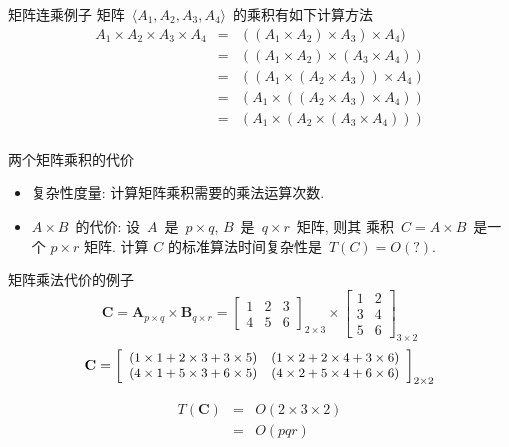 \documentclass[fontset=fandol,UTF8,fleqn]{beamer}
\begin{document}
\begin{frame}{矩阵连乘例子}
 矩阵~$\langle A_1, A_2, A_3, A_4 \rangle$~的乘积有如下计算方法
\begin{eqnarray*}
A_1\times A_2\times A_3\times A_4 & = &  ((A_1\times A_2)\times A_3)\times A_4)
  \\
& = &((A_1\times A_2)\times (A_3\times A_4))  \\
& = & ((A_1\times (A_2\times A_3))\times A_4)  \\
& = & (A_1\times ((A_2\times A_3)\times A_4))  \\
& = & (A_1\times (A_2\times (A_3\times A_4)))  \\
\end{eqnarray*}
\end{frame}

\begin{frame}{两个矩阵乘积的代价}
  \begin{itemize}[<+-|alert@+>]
\item 复杂性度量:  计算矩阵乘积需要的乘法运算次数.  
\item $A\times B$~的代价:  设~$A$~是~$p\times q$, $B$~是~$q\times r$~矩阵, 则其
  乘积~$C=A\times B$~是一个 $p\times r$ 矩阵. 计算 $C$ 的标准算法时间复杂性是~$T(C) = O(?)$. 
\end{itemize}
\end{frame}

\begin{frame}{矩阵乘法代价的例子}
\begin{displaymath}
  \mathbf{C}=\mathbf{A}_{p\times q}\times \mathbf{B}_{q\times r}=\left[ \begin{array}{ccc}
1 & 2 & 3 \\
4 & 5 & 6
\end{array}
\right ]_{2\times 3}
\times \left[ \begin{array}{cc}
1 & 2  \\
3 & 4 \\
5 & 6 
\end{array}
\right ]_{3\times 2} 
\end{displaymath}
\begin{displaymath}
\small{
  \mathbf{C}=\left[ \begin{array}{cc}
(1\times 1+2\times 3+3\times 5) & (1\times 2+2\times 4+3\times 6)\\
(4\times 1+5\times 3+6\times 5) & (4\times 2+5\times 4+6\times 6)\\
\end{array}
\right ]_{2\times 2} 
}
\end{displaymath}

\begin{eqnarray*}
    T(\mathbf{C})& = & O(2\times 3\times 2)  \\ 
                 & = & O(pqr) 
\end{eqnarray*}
\end{frame}             
\end{document}
